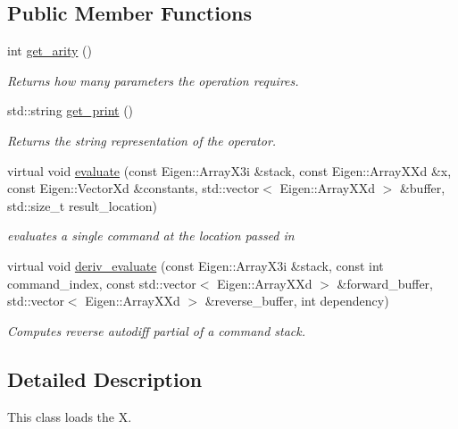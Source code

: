 \subsection*{Public Member Functions}
\begin{DoxyCompactItemize}
\item 
int \hyperlink{classX__Load_a04ac1ceb5aba1a29dcc77234136de802}{get\+\_\+arity} ()\hypertarget{classX__Load_a04ac1ceb5aba1a29dcc77234136de802}{}\label{classX__Load_a04ac1ceb5aba1a29dcc77234136de802}

\begin{DoxyCompactList}\small\item\em Returns how many parameters the operation requires. \end{DoxyCompactList}\item 
std\+::string \hyperlink{classX__Load_af38090c6c8ebcde7f221f6dd15f80bdb}{get\+\_\+print} ()\hypertarget{classX__Load_af38090c6c8ebcde7f221f6dd15f80bdb}{}\label{classX__Load_af38090c6c8ebcde7f221f6dd15f80bdb}

\begin{DoxyCompactList}\small\item\em Returns the string representation of the operator. \end{DoxyCompactList}\item 
virtual void \hyperlink{classX__Load_ab2725c1a3843f12e4f0730aefbcaedd9}{evaluate} (const Eigen\+::\+Array\+X3i \&stack, const Eigen\+::\+Array\+X\+Xd \&x, const Eigen\+::\+Vector\+Xd \&constants, std\+::vector$<$ Eigen\+::\+Array\+X\+Xd $>$ \&buffer, std\+::size\+\_\+t result\+\_\+location)
\begin{DoxyCompactList}\small\item\em evaluates a single command at the location passed in \end{DoxyCompactList}\item 
virtual void \hyperlink{classX__Load_a5ee414b0a344871b8e52d5c9c6c2f51b}{deriv\+\_\+evaluate} (const Eigen\+::\+Array\+X3i \&stack, const int command\+\_\+index, const std\+::vector$<$ Eigen\+::\+Array\+X\+Xd $>$ \&forward\+\_\+buffer, std\+::vector$<$ Eigen\+::\+Array\+X\+Xd $>$ \&reverse\+\_\+buffer, int dependency)
\begin{DoxyCompactList}\small\item\em Computes reverse autodiff partial of a command stack. \end{DoxyCompactList}\end{DoxyCompactItemize}


\subsection{Detailed Description}
This class loads the X. 


